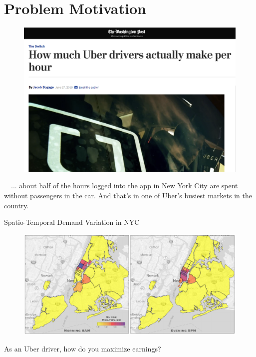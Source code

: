 
\section{Problem Motivation}
\begin{frame}
\vspace{1cm}
\begin{figure}
\includegraphics[width=0.65\paperwidth]{figures/uber_earnings.png}
\end{figure}
\vspace{0.4cm}
\begin{aquote}{}
\ \ ... about half of the hours logged into the app in New York City are spent without passengers in the car. And that’s in one of Uber’s busiest markets in the country.\ \ 
\end{aquote}
\end{frame}

\begin{frame}{Spatio-Temporal Demand Variation in NYC}
\begin{figure}
\centering
\includegraphics[width=0.85\paperwidth]{figures/surge_heatmap.pdf}
\end{figure}
\pause
\begin{center}
As an Uber driver, how do you maximize earnings?
\end{center}
\end{frame}


